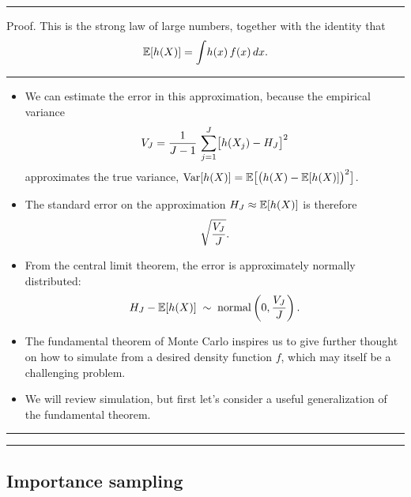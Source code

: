 \documentclass[]{article}
\begin{document}
\begin{center}\rule{0.5\linewidth}{\linethickness}\end{center}

Proof. This is the strong law of large numbers, together with the
identity that \[\mathbb{E}[h(X)] =  \int\!h(x)\,f(x)\,dx.\]

\begin{center}\rule{0.5\linewidth}{\linethickness}\end{center}

\begin{itemize}
\item
  We can estimate the error in this approximation, because the empirical
  variance
  \[V_J = \frac{1}{J-1}\,\sum_{j=1}^{J}\!\big[h(X_j)-H_J\big]^2\]
  approximates the true variance,
  \(\mathrm{Var}[h(X)]=\mathbb{E}\big[\big(h(X)-\mathbb{E}[h(X)]\big)^2\big]\).
\item
  The standard error on the approximation \(H_{J}\approx \mathbb{E}[h(X)]\)
  is therefore \[\sqrt{\frac{V_J}{J}}.\]
\item
  From the central limit theorem, the error is approximately normally
  distributed:
  \[H_J -\mathbb{E}[h(X)]\;\sim\;\mathrm{normal}\left(0,\frac{V_J}{J}\right).\]
\item
  The fundamental theorem of Monte Carlo inspires us to give further
  thought on how to simulate from a desired density function \(f\),
  which may itself be a challenging problem.
\item
  We will review simulation, but first let's consider a useful
  generalization of the fundamental theorem.
\end{itemize}

\begin{center}\rule{0.5\linewidth}{\linethickness}\end{center}

\begin{center}\rule{0.5\linewidth}{\linethickness}\end{center}

\subsection{Importance sampling}\label{importance-sampling}
\end{document}
